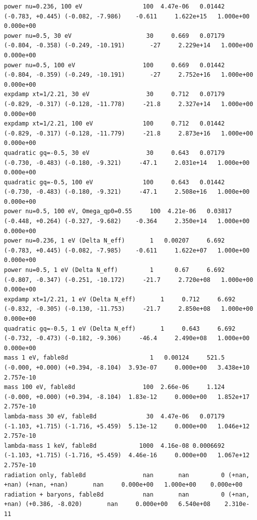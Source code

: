 \begin{landscape}
\begin{Verbatim}[fontsize=\scriptsize,xleftmargin=0pt]
power nu=0.236, 100 eV                 100  4.47e-06   0.01442 (-0.783, +0.445) (-0.082, -7.986)    -0.611     1.622e+15   1.000e+00    0.000e+00
power nu=0.5, 30 eV                     30     0.669   0.07179 (-0.804, -0.358) (-0.249, -10.191)       -27     2.229e+14   1.000e+00    0.000e+00
power nu=0.5, 100 eV                   100     0.669   0.01442 (-0.804, -0.359) (-0.249, -10.191)       -27     2.752e+16   1.000e+00    0.000e+00
expdamp xt=1/2.21, 30 eV                30     0.712   0.07179 (-0.829, -0.317) (-0.128, -11.778)     -21.8     2.327e+14   1.000e+00    0.000e+00
expdamp xt=1/2.21, 100 eV              100     0.712   0.01442 (-0.829, -0.317) (-0.128, -11.779)     -21.8     2.873e+16   1.000e+00    0.000e+00
quadratic gq=-0.5, 30 eV                30     0.643   0.07179 (-0.730, -0.483) (-0.180, -9.321)     -47.1     2.031e+14   1.000e+00    0.000e+00
quadratic gq=-0.5, 100 eV              100     0.643   0.01442 (-0.730, -0.483) (-0.180, -9.321)     -47.1     2.508e+16   1.000e+00    0.000e+00
power nu=0.5, 100 eV, Omega_qp0=0.55     100  4.21e-06   0.03817 (-0.448, +0.264) (-0.327, -9.682)    -0.364     2.350e+14   1.000e+00    0.000e+00
power nu=0.236, 1 eV (Delta N_eff)       1   0.00207     6.692 (-0.783, +0.445) (-0.082, -7.985)    -0.611     1.622e+07   1.000e+00    0.000e+00
power nu=0.5, 1 eV (Delta N_eff)         1      0.67     6.692 (-0.807, -0.347) (-0.251, -10.172)     -21.7     2.720e+08   1.000e+00    0.000e+00
expdamp xt=1/2.21, 1 eV (Delta N_eff)       1     0.712     6.692 (-0.832, -0.305) (-0.130, -11.753)     -21.7     2.850e+08   1.000e+00    0.000e+00
quadratic gq=-0.5, 1 eV (Delta N_eff)       1     0.643     6.692 (-0.732, -0.473) (-0.182, -9.306)     -46.4     2.490e+08   1.000e+00    0.000e+00
mass 1 eV, fable8d                       1   0.00124     521.5 (-0.000, +0.000) (+0.394, -8.104)  3.93e-07     0.000e+00   3.438e+10    2.757e-10
mass 100 eV, fable8d                   100  2.66e-06     1.124 (-0.000, +0.000) (+0.394, -8.104)  1.83e-12     0.000e+00   1.852e+17    2.757e-10
lambda-mass 30 eV, fable8d              30  4.47e-06   0.07179 (-1.103, +1.715) (-1.716, +5.459)  5.13e-12     0.000e+00   1.046e+12    2.757e-10
lambda-mass 1 keV, fable8d            1000  4.16e-08 0.0006692 (-1.103, +1.715) (-1.716, +5.459)  4.46e-16     0.000e+00   1.067e+12    2.757e-10
radiation only, fable8d                nan       nan         0 (+nan, +nan) (+nan, +nan)       nan     0.000e+00   1.000e+00    0.000e+00
radiation + baryons, fable8d           nan       nan         0 (+nan, +nan) (+0.386, -8.020)       nan     0.000e+00   6.540e+08    2.310e-11
\end{Verbatim}
\end{landscape}

